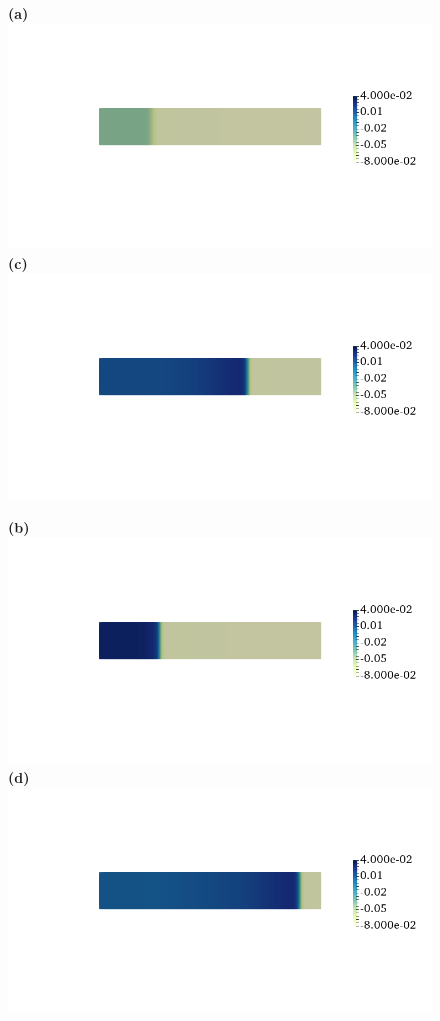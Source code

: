 \documentclass[12pt,a4paper]{article}
\begin{document}
\begin{figure}
\begin{minipage}{0.47\textwidth}
 \textbf{(a)} \includegraphics[trim=0cm 4cm 0cm 4cm, clip=true, width=0.9\linewidth]{v5}
      \textbf{(c)} \includegraphics[trim=0cm 4cm 0cm 4cm, clip=true, width=0.9\linewidth]{v100}
    \end{minipage}
    \begin{minipage}{0.47\textwidth}
  \textbf{(b)} \includegraphics[trim=0cm 4cm 0cm 4cm, clip=true, width=0.9\linewidth]{v15}
  \textbf{(d)} \includegraphics[trim=0cm 4cm 0cm 4cm, clip=true, width=0.9\linewidth]{v150}

\end{minipage}
\end{figure}
\end{document}
